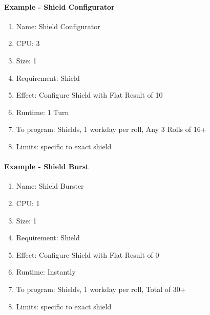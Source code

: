 \paragraph{Example - Shield Configurator}
\begin{enumerate}
    \item Name: Shield Configurator
    \item CPU: 3
    \item Size: 1
    \item Requirement: Shield
    \item Effect: Configure Shield with Flat Result of 10
    \item Runtime: 1 Turn
    \item To program: Shields, 1 workday per roll, Any 3 Rolls of 16+
    \item Limits: specific to exact shield
\end{enumerate}

\paragraph{Example - Shield Burst}
\begin{enumerate}
    \item Name: Shield Burster
    \item CPU: 1
    \item Size: 1
    \item Requirement: Shield
    \item Effect: Configure Shield with Flat Result of 0
    \item Runtime: Instantly
    \item To program: Shields, 1 workday per roll, Total of 30+
    \item Limits: specific to exact shield
\end{enumerate}
